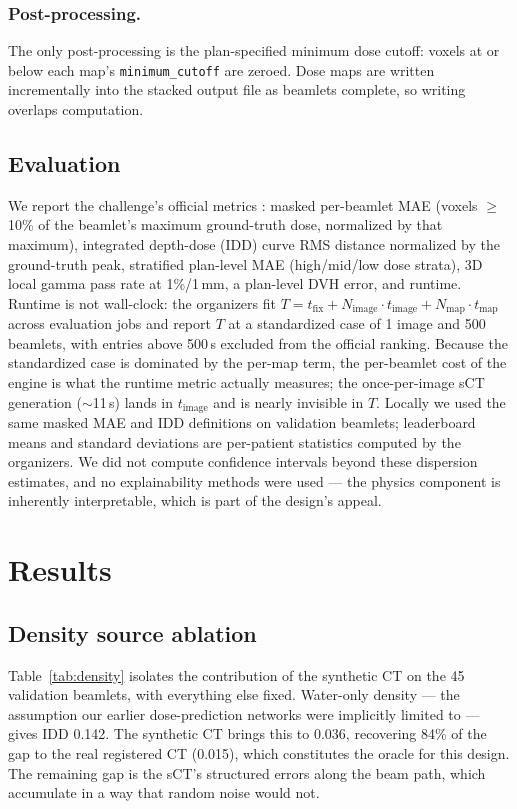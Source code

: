 \documentclass[runningheads]{llncs}
\begin{document}
\subsubsection{Post-processing.}
The only post-processing is the plan-specified minimum dose cutoff: voxels at or below each map's \texttt{minimum\_cutoff} are zeroed. Dose maps are written incrementally into the stacked output file as beamlets complete, so writing overlaps computation.

\subsection{Evaluation}
We report the challenge's official metrics \cite{doserad_metrics}: masked per-beamlet MAE (voxels $\geq$10\% of the beamlet's maximum ground-truth dose, normalized by that maximum), integrated depth-dose (IDD) curve RMS distance normalized by the ground-truth peak, stratified plan-level MAE (high/mid/low dose strata), 3D local gamma pass rate at 1\%/1\,mm, a plan-level DVH error, and runtime. Runtime is not wall-clock: the organizers fit $T = t_{\mathrm{fix}} + N_{\mathrm{image}} \cdot t_{\mathrm{image}} + N_{\mathrm{map}} \cdot t_{\mathrm{map}}$ across evaluation jobs and report $T$ at a standardized case of 1 image and 500 beamlets, with entries above 500\,s excluded from the official ranking. Because the standardized case is dominated by the per-map term, the per-beamlet cost of the engine is what the runtime metric actually measures; the once-per-image sCT generation ($\sim$11\,s) lands in $t_{\mathrm{image}}$ and is nearly invisible in $T$. Locally we used the same masked MAE and IDD definitions on validation beamlets; leaderboard means and standard deviations are per-patient statistics computed by the organizers. We did not compute confidence intervals beyond these dispersion estimates, and no explainability methods were used --- the physics component is inherently interpretable, which is part of the design's appeal.

\section{Results}

\subsection{Density source ablation}
Table~\ref{tab:density} isolates the contribution of the synthetic CT on the 45 validation beamlets, with everything else fixed. Water-only density --- the assumption our earlier dose-prediction networks were implicitly limited to --- gives IDD 0.142. The synthetic CT brings this to 0.036, recovering 84\% of the gap to the real registered CT (0.015), which constitutes the oracle for this design. The remaining gap is the sCT's structured errors along the beam path, which accumulate in a way that random noise would not.
\end{document}
